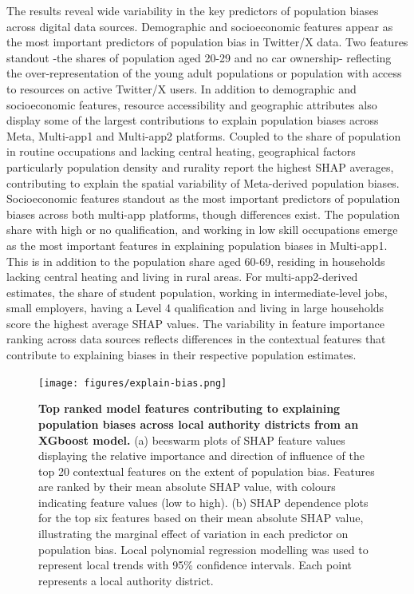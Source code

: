 \documentclass{article}
\begin{document}
The results reveal wide variability in the key predictors of population
biases across digital data sources. Demographic and socioeconomic
features appear as the most important predictors of population bias in
Twitter/X data. Two features standout -the shares of population aged
20-29 and no car ownership- reflecting the over-representation of the
young adult populations or population with access to resources on active
Twitter/X users. In addition to demographic and socioeconomic features,
resource accessibility and geographic attributes also display some of
the largest contributions to explain population biases across Meta,
Multi-app1 and Multi-app2 platforms. Coupled to the share of population
in routine occupations and lacking central heating, geographical factors
particularly population density and rurality report the highest SHAP
averages, contributing to explain the spatial variability of
Meta-derived population biases. Socioeconomic features standout as the
most important predictors of population biases across both multi-app
platforms, though differences exist. The population share with high or
no qualification, and working in low skill occupations emerge as the
most important features in explaining population biases in Multi-app1.
This is in addition to the population share aged 60-69, residing in
households lacking central heating and living in rural areas. For
multi-app2-derived estimates, the share of student population, working
in intermediate-level jobs, small employers, having a Level 4
qualification and living in large households score the highest average
SHAP values. The variability in feature importance ranking across data
sources reflects differences in the contextual features that contribute
to explaining biases in their respective population estimates.

\begin{figure}
\centering
\texttt{[image: figures/explain-bias.png]}
\caption{\textbf{Top ranked model features contributing to explaining population
biases across local authority districts from an XGboost model.} (a)
beeswarm plots of SHAP feature values displaying the relative importance
and direction of influence of the top 20 contextual features on the
extent of population bias. Features are ranked by their mean absolute
SHAP value, with colours indicating feature values (low to high). (b)
SHAP dependence plots for the top six features based on their mean
absolute SHAP value, illustrating the marginal effect of variation in
each predictor on population bias. Local polynomial regression modelling
was used to represent local trends with 95\% confidence intervals. Each
point represents a local authority
district.}\label{fig:shap-plots}
\end{figure}
\end{document}
